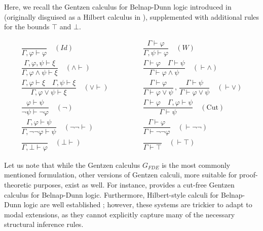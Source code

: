 \documentclass{amsart}
\theoremstyle{plain}
\theoremstyle{definition}
\begin{document}
Here, we recall the Gentzen calculus for Belnap-Dunn logic introduced in \cite{Font:BD} (originally disguised as a Hilbert calculus in \cite{Anderson-Belnap:Entailment}), supplemented with additional rules for the bounds $\top$ and $\bot$.
\begin{table}[htbp]
\centering
\label{f:GB}
\begin{align*}
\dfrac{}{\Gamma, \varphi \vdash \varphi} \quad (Id) 
&\qquad\qquad 
\dfrac{\Gamma \vdash \varphi}{\Gamma, \psi \vdash \varphi} \quad (W) 
\\[1em]
\dfrac{\Gamma, \varphi, \psi \vdash \xi}{\Gamma, \varphi \land \psi \vdash \xi} \quad (\land \vdash) 
&\qquad\qquad
\dfrac{\Gamma \vdash \varphi \quad \Gamma \vdash \psi}{\Gamma \vdash \varphi \land \psi} \quad (\vdash \land)
\\[1em]
\dfrac{\Gamma, \varphi \vdash \xi \quad \Gamma, \psi \vdash \xi}{\Gamma, \varphi \lor \psi \vdash \xi} \quad (\lor \vdash) 
&\qquad\qquad
\dfrac{\Gamma \vdash \varphi}{\Gamma \vdash \varphi \lor \psi} \, , \, \dfrac{\Gamma \vdash \psi}{\Gamma \vdash \varphi \lor \psi} \quad (\vdash \lor)
\\[1em]
\dfrac{\varphi \vdash \psi}{\neg \psi \vdash \neg \varphi} \quad (\neg) 
&\qquad\qquad
\dfrac{\Gamma \vdash \varphi \quad \Gamma, \varphi \vdash \psi}{\Gamma \vdash \psi} \quad (\text{Cut})
\\[1em]
\dfrac{\Gamma, \varphi \vdash \psi}{\Gamma, \neg\neg\varphi \vdash \psi} \quad (\neg\neg \vdash) 
&\qquad\qquad
\dfrac{\Gamma \vdash \varphi}{\Gamma \vdash \neg\neg\varphi} \quad (\vdash \neg\neg)
\\[1em]
\dfrac{}{\Gamma, \bot \vdash \varphi} \quad (\bot \vdash) 
&\qquad\qquad
\dfrac{}{\Gamma \vdash \top} \quad (\vdash \top)
\end{align*}
\caption{The rules of the sequent calculus $G_{FDE}$}
\end{table}

Let us note that while the Gentzen calculus $G_{FDE}$ is the most commonly mentioned formulation, other versions of Gentzen calculi, more suitable for proof-theoretic purposes, exist as well. For instance, \cite{Pynko:Genzen} provides a cut-free Gentzen calculus for Belnap-Dunn logic. Furthermore, Hilbert-style calculi for Belnap-Dunn logic are well established \cite{Font:BD,Shramko:HilbertFDE}; however, these systems are trickier to adapt to modal extensions, as they cannot explicitly capture many of the necessary structural inference rules.
\end{document}
